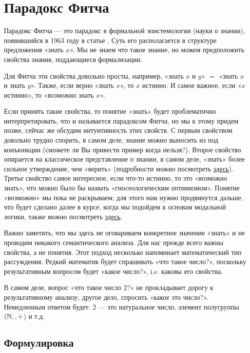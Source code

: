 \documentclass[openany]{book}
\theoremstyle{plain}
\theoremstyle{definition}
\begin{document}
\section{ Парадокс Фитча }

Парадокс Фитча — это парадокс в формальной эпистемологии (науки о знании), появившийся в 1963 году в статье \cite{Fitch}. Суть его располагается в структуре предложения «знать \(x\)». Мы не знаем что такое знание, но можем предположить свойства знания, поддающиеся формализации.

Для Фитча эти свойства довольно просты, например, «знать \(x\) и \(y\)» \(=\) «знать \(x\) и знать \(y\)». Также, если верно «знать \(x\)», то \(x\) истинно. И самое важное, если «\(x\) истинно», то «возможно знать \(x\)».

Если принять такие свойства, то понятие «знать» будет проблематично интерпретировать, что и называется парадоксом Фитча, но мы к этому придем позже, сейчас же обсудим интуитивность этих свойств. С первым свойством довольно трудно спорить, в самом деле, знание можно выносить из под конъюнкции (сможете ли Вы привести пример когда нельзя?). Второе свойство опирается на классическое представление о знании, в самом деле, «знать» более сильное утверждение, чем «верить» (подробности можно посмотреть \href{https://plato.stanford.edu/entries/knowledge-analysis/}{здесь}). Третье свойство самое интересное, если что-то истинно, то это «возможно знать», что можно было бы назвать «гносеологическим оптимизмом». Понятие «возможно» мы пока не раскрываем; для этого нам нужно продвинутся дальше, что будет сделано далее в курсе, когда мы подойдем к основам модальной логики, также можно посмотреть \href{https://plato.stanford.edu/entries/logic-modal}{здесь}.

Важно заметить, что мы здесь не оговариваем конкретное значение «знать» и не проводим никакого семантического анализа. Для нас прежде всего важны свойства, а не понятия. Этот подход несколько напоминает математический тип рассуждения. Редкий математик будет спрашивать «что такое число?», поскольку результативным вопросом будет «какое число?», i.e. каковы его свойства.

В самом деле, вопрос «что такое число 2?» не прокладывает дорогу к результативному анализу, другое дело, спросить «какое это число?». Немедленным ответом будет: 2 — это натуральное число, элемент полугруппы \((\mathbb{N}, \\, +\)) и т.д.

\subsection{ Формулировка }
\end{document}
